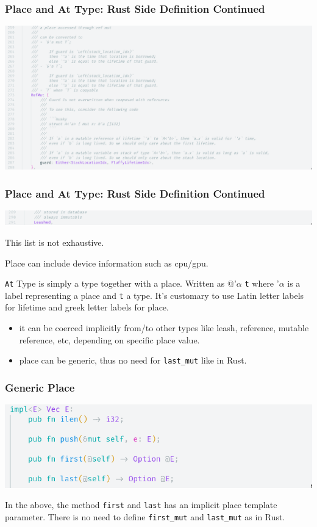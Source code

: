 \documentclass{beamer}   	%
\theoremstyle{definition}
\newcommand{\rust}[1]{\texttt{#1}}
\newcommand{\husky}[1]{\texttt{#1}}
\begin{document}
\begin{frame}
\frametitle{Place and At Type: Rust Side Definition Continued}

\includegraphics[width=\linewidth]{snapshots/husky_place_defn02.png}
\end{frame}

\begin{frame}
\frametitle{Place and At Type: Rust Side Definition Continued}

\includegraphics[width=\linewidth]{snapshots/husky_place_defn03.png}

This list is not exhaustive.

Place can include device information such as cpu/gpu.

\husky{At} Type is simply a type together with a place. Written as @'$\alpha$ \husky{t} where '$\alpha$ is a label representing a place and \husky{t} a type. It's customary to use Latin letter labels for lifetime and greek letter labels for place.
\begin{itemize}
	\item it can be coerced implicitly from/to other types like leash, reference, mutable reference, etc, depending on specific place value.
	\item place can be generic, thus no need for \rust{last_mut} like in Rust.
\end{itemize}
\end{frame}

\begin{frame}
\frametitle{Generic Place}
\includegraphics[width=\linewidth]{snapshots/husky_generic_place.png}

In the above, the method \husky{first} and \husky{last} has an implicit place template parameter. There is no need to define \husky{first_mut} and \husky{last_mut} as in Rust.
\end{frame}
\end{document}
